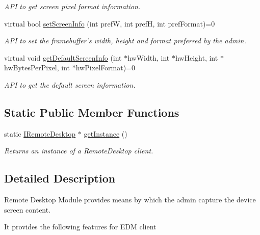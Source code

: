 \begin{DoxyCompactItemize}
\begin{DoxyCompactList}\small\item\em \-A\-P\-I to get screen pixel format information. \end{DoxyCompactList}\item 
virtual bool \hyperlink{classandroid_1_1IRemoteDesktop_ac0026eaa9da3215bfc418fbaa891ec0b}{set\-Screen\-Info} (int pref\-W, int pref\-H, int pref\-Format)=0
\begin{DoxyCompactList}\small\item\em \-A\-P\-I to set the framebuffer's width, height and format preferred by the admin. \end{DoxyCompactList}\item 
virtual void \hyperlink{classandroid_1_1IRemoteDesktop_a8c66b98b6756dcfe5e8899eda2fe3887}{get\-Default\-Screen\-Info} (int $\ast$hw\-Width, int $\ast$hw\-Height, int $\ast$hw\-Bytes\-Per\-Pixel, int $\ast$hw\-Pixel\-Format)=0
\begin{DoxyCompactList}\small\item\em \-A\-P\-I to get the default screen information. \end{DoxyCompactList}\end{DoxyCompactItemize}
\subsection*{\-Static \-Public \-Member \-Functions}
\begin{DoxyCompactItemize}
\item 
static \hyperlink{classandroid_1_1IRemoteDesktop}{\-I\-Remote\-Desktop} $\ast$ \hyperlink{classandroid_1_1IRemoteDesktop_a4686215ee98981d640bbc5ec100e42ca}{get\-Instance} ()
\begin{DoxyCompactList}\small\item\em \-Returns an instance of a \-Remote\-Desktop client. \end{DoxyCompactList}\end{DoxyCompactItemize}


\subsection{\-Detailed \-Description}
\-Remote \-Desktop \-Module provides means by which the admin capture the device screen content. 

\-It provides the following features for \-E\-D\-M client\par


